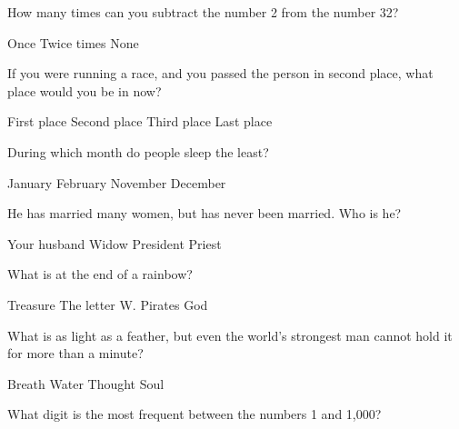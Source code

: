 \begin{questions}
\question How many times can you subtract the number 2 from the number 32?
\begin{multicols}{4}
\begin{choices}  
\CorrectChoice Once
\choice Twice 
 times
\choice None
\end{choices}
\end{multicols} 

\question If you were running a race, and you passed the person in second place, what place would you be in now?
\begin{multicols}{4}
\begin{choices} 
\choice First place 
\CorrectChoice Second place 
\choice Third place 
\choice Last place 
\end{choices}
\end{multicols} 

\question During which month do people sleep the least? 
\begin{multicols}{4}
\begin{choices}  
\choice January 
\CorrectChoice February
\choice November 
\choice December 
\end{choices}
\end{multicols} 

\question He has married many women, but has never been married. Who is he? 
\begin{multicols}{4}
\begin{choices}  
\choice Your husband 
\choice Widow
\choice President 
\CorrectChoice Priest
\end{choices}
\end{multicols}

\question What is at the end of a rainbow?
\begin{multicols}{4}
\begin{choices} 
\choice Treasure 
\CorrectChoice The letter W. 
\choice Pirates 
\choice God  
\end{choices}
\end{multicols} 

\question What is as light as a feather, but even the world's strongest man cannot hold it for more than a minute? 
\begin{multicols}{4}
\begin{choices} 
\CorrectChoice Breath
\choice Water 
\choice Thought 
\choice Soul
\end{choices}
\end{multicols} 

\question  What digit is the most frequent between the numbers 1 and 1,000?
\begin{multicols}{4}
\begin{choices}  
\end{choices}
\end{multicols} 


\end{questions}
